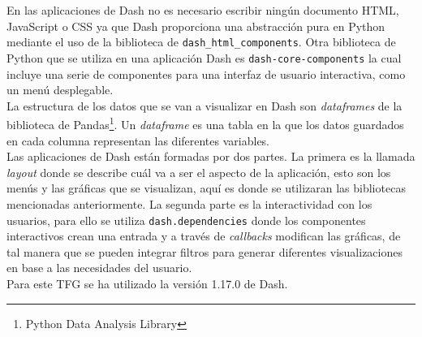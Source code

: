 En las aplicaciones de Dash no es necesario escribir ningún documento HTML, JavaScript o CSS ya que Dash proporciona una abstracción pura en Python mediante el uso de la biblioteca de \texttt{dash\_html\_components}. Otra biblioteca de Python que se utiliza en una aplicación Dash es \texttt{dash-core-components} la cual incluye una serie de componentes para una interfaz de usuario interactiva, como un menú desplegable.\\

La estructura de los datos que se van a visualizar en  Dash son \textit{dataframes} de la biblioteca de Pandas\footnote{Python Data Analysis Library}. Un \textit{dataframe} es una tabla en la que los datos guardados en cada columna representan las diferentes variables.\\

Las aplicaciones de Dash están formadas por dos partes. La primera es la llamada \textit{layout} donde se describe cuál va a ser el aspecto de la aplicación, esto son los menús y las gráficas que se visualizan, aquí es donde se utilizaran las bibliotecas mencionadas anteriormente. La segunda parte es la interactividad con los usuarios, para ello se utiliza \texttt{dash.dependencies} donde los componentes interactivos crean una entrada y a través de \textit{callbacks} modifican las gráficas, de tal manera que se pueden integrar filtros para generar diferentes visualizaciones en base a las necesidades del usuario.\\

Para este TFG se ha utilizado la versión 1.17.0 de Dash.















